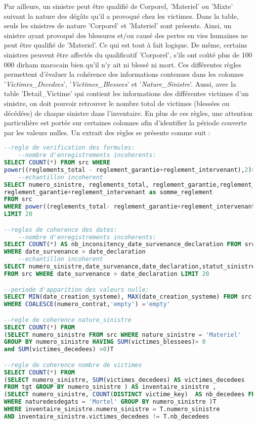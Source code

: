 Par ailleurs, un sinistre peut \^etre qualifi\'e de Corporel, 'Materiel' ou 'Mixte' suivant la nature des d\'eg\^ats qu'il a provoqu\'e chez les victimes. Dans la table, seuls les sinistres de nature 'Corporel' et 'Materiel' sont pr\'esents. Ainsi, un sinistre ayant provoqu\'e des blessures et/ou caus\'e des pertes en vies humaines ne peut \^etre qualifi\'e de 'Materiel'. Ce qui est tout \`a fait logique. De m\^eme, certains sinistres peuvent \^etre affect\'es du qualificatif 'Corporel', s'ils ont co\^ut\'e plus de 100 000 dirham marocain bien qu'il n'y ait ni bless\'e ni mort. Ces diff\'erentes r\`egles permettent d'\'evaluer la coh\'erence des informations contenues dans les colonnes '\textit{Victimes\_Decedees}', '\textit{Victimes\_Blessees}' et '\textit{Nature\_Sinistre}'. Aussi, avec la table 'Detail\_Victime' qui contient les informations des diff\'erentes victimes d'un sinistre, on doit pouvoir retrouver le nombre total de victimes (bless\'ees ou d\'ec\'ed\'ees) de chaque sinistre dans l'inventaire. En plus de ces r\`egles, une attention particuli\`ere est port\'ee sur certaines colonnes afin d'identifier la p\'eriode couverte par les valeurs nulles. Un extrait des r\`egles se pr\'esente comme suit : 
\begin{lstlisting}[language=SQL,caption={R\`egle de la Dimension Coh\'erence pour la table \textit{Inventaire\_Sinistre}},captionpos=b,showspaces=false,basicstyle=\scriptsize,numbers=none,commentstyle=\color{gray},backgroundcolor=\color{background}]
--regle de verification des formules: 
	--nombre d'enregistrements incoherents:
SELECT COUNT(*) FROM src WHERE 
power((reglements_total - reglement_garantie+reglement_intervenant),2)>1
	--echantillon incoherent
SELECT numero_sinistre, reglements_total, reglement_garantie,reglement_intervenant,
reglement_garantie+reglement_intervenant as somme_reglement 
FROM src 
WHERE power((reglements_total- reglement_garantie+reglement_intervenant),2)>1 
LIMIT 20

--regles de coherence des dates:
	--nombre d'enregistrements incoherents:
SELECT COUNT(*) AS nb_inconsitency_date_survenance_declaration FROM src 
WHERE date_survenance > date_declaration 
	--echantillon incoherent
SELECT numero_sinistre,date_survenance,date_declaration,statut_sinistre 
FROM src WHERE date_survenance > date_declaration LIMIT 20

--periode d'apparition des valeurs nulle:
SELECT MIN(date_creation_systeme), MAX(date_creation_systeme) FROM src 
WHERE COALESCE(numero_contrat,'empty') ='empty'

--regle de coherence nature_sinistre
SELECT COUNT(*) FROM  
(SELECT numero_sinistre FROM src WHERE nature_sinistre = 'Materiel' 
GROUP BY numero_sinistre HAVING SUM(victimes_blessees)> 0 
and SUM(victimes_decedees) >0)T

--regle de coherence nombre de victimes
SELECT COUNT(*) FROM 
(SELECT numero_sinistre, SUM(victimes_decedees) AS victimes_decedees 
FROM tgt GROUP BY numero_sinistre ) AS inventaire_sinistre ,
(SELECT numero_sinistre, COUNT(DISTINCT victime_key)  AS nb_decedees FROM src 
WHERE naturedesdegats = 'Mortel' GROUP BY numero_sinistre )T 
WHERE inventaire_sinistre.numero_sinistre = T.numero_sinistre 
AND inventaire_sinistre.victimes_decedees != T.nb_decedees
\end{lstlisting}
